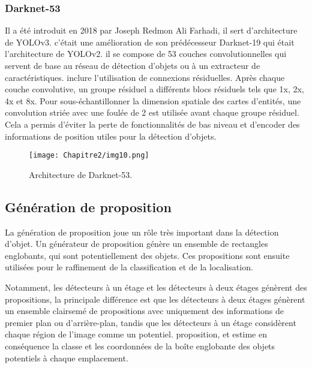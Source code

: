            \subsubsection{Darknet-53} \cite{yolov3_paper}
           Il a été introduit en 2018 par Joseph Redmon Ali Farhadi, il sert d'architecture de YOLOv3. c'était une amélioration de son prédécesseur Darknet-19 qui était l'architecture de YOLOv2. il se compose de 53 couches convolutionnelles qui servent de base au réseau de détection d'objets ou à un extracteur de caractéristiques. inclure l'utilisation de connexions résiduelles. Après chaque couche convolutive, un groupe résiduel a différents blocs résiduels tels que 1x, 2x, 4x et 8x. Pour sous-échantillonner la dimension spatiale des cartes d'entités, une convolution striée avec une foulée de 2 est utilisée avant chaque groupe résiduel. Cela a permis d'éviter la perte de fonctionnalités de bas niveau et d'encoder des informations de position utiles pour la détection d'objets.
           \begin{figure}[H]
                \centering
                \texttt{[image: Chapitre2/img10.png]}
                \caption{Architecture de Darknet-53.}
                \label{img10}
                \end{figure}


     \subsection{Génération de proposition}
     La génération de proposition joue un rôle très important dans la détection d'objet. Un générateur de proposition génère un ensemble de rectangles englobants, qui sont potentiellement des objets. Ces propositions sont ensuite utilisées pour le raffinement de la classification et de la localisation. 
     
     Notamment, les détecteurs à un étage et les détecteurs à deux étages génèrent des propositions, la principale différence est que les détecteurs à deux étages génèrent un ensemble clairsemé de propositions avec uniquement des informations de premier plan ou d'arrière-plan, tandis que les détecteurs à un étage considèrent chaque région de l'image comme un potentiel. proposition, et estime en conséquence la classe et les coordonnées de la boîte englobante des objets potentiels à chaque emplacement.
     
